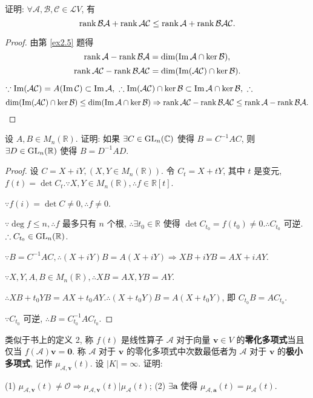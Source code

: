 \documentclass{ctexart}
\begin{document}
\begin{exercise}%
    证明: $\forall\mathcal{A},\mathcal{B},\mathcal{C}\in\mathcal{L}V$, 有
    \[\operatorname{rank} \mathcal{BA}+\operatorname{rank} \mathcal{AC}\leq\operatorname{rank} \mathcal{A}+\operatorname{rank} \mathcal{BAC}.\]
\end{exercise}
\begin{proof}
    由第 \ref{ex2.5} 题得
    \[\operatorname{rank} \mathcal{A}-\operatorname{rank} \mathcal{BA}=\dim(\operatorname{Im} \mathcal{A}\cap\ker\mathcal{B}),\]
    \[\operatorname{rank} \mathcal{AC}-\operatorname{rank} \mathcal{BAC}=\dim(\operatorname{Im} (\mathcal{AC})\cap\ker\mathcal{B}).\]

    $\because\operatorname{Im} (\mathcal{AC})=A(\operatorname{Im} \mathcal{C})\subset\operatorname{Im} \mathcal{A},\ \therefore\operatorname{Im} (\mathcal{AC})\cap\ker\mathcal{B}\subset\operatorname{Im} \mathcal{A}\cap\ker\mathcal{B},\ \therefore$
    \[\dim(\operatorname{Im} (\mathcal{AC})\cap\ker\mathcal{B})\leq\dim(\operatorname{Im} \mathcal{A}\cap\ker\mathcal{B})\Rightarrow\operatorname{rank} \mathcal{AC}-\operatorname{rank} \mathcal{BAC}\leq\operatorname{rank} \mathcal{A}-\operatorname{rank} \mathcal{BA}.\qedhere\]
\end{proof}
\begin{exercise}%
    设 $A,B\in M_n(\mathbb{R})$. 证明: 如果 $\exists C\in \operatorname{GL} _n(\mathbb{C})$ 使得 $B=C^{-1}AC$, 则 $\exists D\in \operatorname{GL} _n(\mathbb{R})$ 使得 $B=D^{-1}AD$.
\end{exercise}
\begin{proof}
    设 $C=X+iY,(X,Y\in M_n(\mathbb{R}))$. 令 $C_t=X+tY$, 其中 $t$ 是变元, $f(t)=\det C_t.\because X,Y\in M_n(\mathbb{R}),\therefore f\in\mathbb{R}[t]$.
    
    $\because f(i)=\det C\neq0,\therefore f\neq0$.

    $\because\deg f\leq n,\therefore f$ 最多只有 $n$ 个根, $\therefore\exists t_0\in\mathbb{R}$ 使得 $\det C_{t_0}=f(t_0)\neq0.\therefore C_{t_0}$ 可逆. $\therefore C_{t_0}\in \operatorname{GL} _n(\mathbb{R})$.

    $\because B=C^{-1}AC,\therefore(X+iY)B=A(X+iY)\Rightarrow XB+iYB=AX+iAY$.

    $\because X,Y,A,B\in M_n(\mathbb{R}),\therefore XB=AX,YB=AY$.

    $\therefore XB+t_0YB=AX+t_0AY.\therefore(X+t_0Y)B=A(X+t_0Y)$, 即 $C_{t_0}B=AC_{t_0}$.

    $\because C_{t_0}$ 可逆, $\therefore B=C_{t_0}^{-1}AC_{t_0}$.
\end{proof}
\begin{exercise}%
    类似于书上的定义 2, 称 $f(t)$ 是线性算子 $\mathcal{A}$ 对于向量 $\boldsymbol{v}\in V$ 的\textbf{零化多项式}当且仅当 $f(\mathcal{A})\boldsymbol{v}=\boldsymbol{0}$. 称 $\mathcal{A}$ 对于 $\boldsymbol{v}$ 的零化多项式中次数最低者为 $\mathcal{A}$ 对于 $\boldsymbol{v}$ 的\textbf{极小多项式}, 记作 $\mu_{\mathcal{A},\boldsymbol{v}}(t)$. 设 $|K|=\infty$. 证明:

    (1) $\mu_{\mathcal{A},\boldsymbol{v}}(t)\neq\mathcal{O}\Rightarrow\mu_{\mathcal{A},\boldsymbol{v}}(t)|\mu_{\mathcal{A}}(t)$; (2) $\exists\boldsymbol{a}$ 使得 $\mu_{\mathcal{A},\boldsymbol{a}}(t)=\mu_{\mathcal{A}}(t)$.
\end{exercise}
\end{document}
